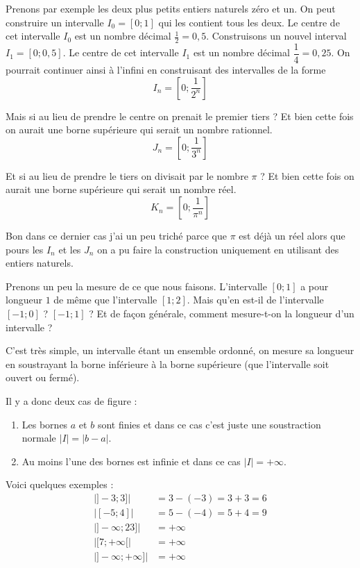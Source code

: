 \documentclass[11pt]{article}
\begin{document}
Prenons par exemple les deux plus petits entiers naturels zéro et
un. On peut construire un intervalle \(I_0 = [0 ; 1]\) qui les contient
tous les deux. Le centre de cet intervalle \(I_0\) est un nombre décimal
\(\frac{1}{2} = 0,5\). Construisons un nouvel interval \(I_1 = [0;
   0,5]\). Le centre de cet intervalle \(I_1\) est un nombre décimal
\(\dfrac{1}{4} = 0,25\). On pourrait continuer ainsi à l'infini en
construisant des intervalles de la forme \[I_n = \left[0 ;
   \dfrac{1}{2^n}\right]\]

Mais si au lieu de prendre le centre on prenait le premier tiers ?
Et bien cette fois on aurait une borne supérieure qui serait un
nombre rationnel. \[J_n = \left[0 ; \dfrac{1}{3^n}\right]\]

Et si au lieu de prendre le tiers on divisait par le nombre \(\pi\) ?
Et bien cette fois on aurait une borne supérieure qui serait un
nombre réel. \[K_n = \left[0 ; \dfrac{1}{\pi^n}\right]\]

Bon dans ce dernier cas j'ai un peu triché parce que \(\pi\) est déjà
un réel alors que pours les \(I_n\) et les \(J_n\) on a pu faire la
construction uniquement en utilisant des entiers naturels.

Prenons un peu la mesure de ce que nous faisons. L'intervalle \([0 ;
   1]\) a pour longueur \(1\) de même que l'intervalle \([1 ; 2]\). Mais
qu'en est-il de l'intervalle \([-1 ; 0]\) ? \([-1 ; 1]\) ? Et de façon
générale, comment mesure-t-on la longueur d'un intervalle ?

C'est très simple, un intervalle étant un ensemble ordonné, on
mesure sa longueur en soustrayant la borne inférieure à la borne
supérieure (que l'intervalle soit ouvert ou fermé).

Il y a donc deux cas de figure :
\begin{enumerate}
\item Les bornes \(a\) et \(b\) sont finies et dans ce cas c'est juste une
soustraction normale \(|I| = |b - a|\).
\item Au moins l'une des bornes est infinie et dans ce cas \(|I| =
      +\infty\).
\end{enumerate}

Voici quelques exemples :
\begin{align}
\lvert ]-3 ; 3] \rvert &= 3 - (-3) = 3 + 3 = 6\\
\lvert [-5 ; 4] \rvert &= 5 - (-4) = 5 + 4 = 9\\
\lvert ]-\infty ; 23] \rvert &= +\infty\\
\lvert [7 ; +\infty[ \rvert &= +\infty\\
\lvert ]-\infty ; +\infty] \rvert &= +\infty
\end{align}
\end{document}
